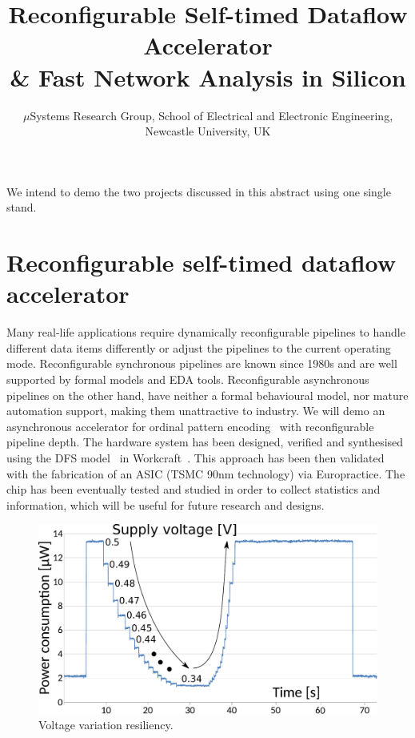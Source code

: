 \documentclass[conference]{IEEEtran}
\begin{document}
\title{Reconfigurable Self-timed Dataflow Accelerator \\\& Fast Network Analysis in Silicon}

\author{$\mu$Systems Research Group, School of Electrical and Electronic Engineering, Newcastle University, UK}

\maketitle


\IEEEpeerreviewmaketitle

\noindent
We intend to demo the two projects discussed in this abstract using one single stand.

\section*{Reconfigurable self-timed dataflow accelerator}
Many real-life applications require dynamically
reconfigurable pipelines to handle different data items differently or adjust
the pipelines to the current operating mode. Reconfigurable synchronous
pipelines are known since 1980s and are well
supported by formal models and EDA tools. Reconfigurable asynchronous
pipelines on the other hand, have neither a formal behavioural model, nor
mature automation support, making them unattractive to industry.
We will demo an asynchronous accelerator for ordinal pattern encoding~\cite{OPE} with
reconfigurable pipeline depth. The hardware system has been designed, verified and synthesised
using the DFS model~\cite{DFS} in Workcraft~\cite{workcraft_web}. This approach has been
then validated with the fabrication of an ASIC (TSMC 90nm technology) via
Europractice. The chip has been eventually tested and studied in order to collect statistics
and information, which will be useful for future research and designs.

\begin{figure}[ht!]
\vspace{-3mm}
\begin{center}
	\includegraphics[width=\linewidth]{FIG/voltage-var.pdf}
	\caption{Voltage variation resiliency.}
	\label{fig:voltage-var}
\end{center}
\vspace{-5mm}
\end{figure}
\end{document}
